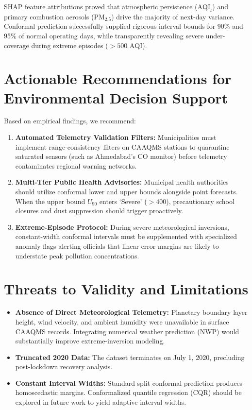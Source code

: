 \documentclass[11pt,a4paper]{report}
\begin{document}
SHAP feature attributions proved that atmospheric persistence ($\text{AQI}_t$) and primary combustion aerosols ($\text{PM}_{2.5}$) drive the majority of next-day variance. Conformal prediction successfully supplied rigorous interval bounds for 90\% and 95\% of normal operating days, while transparently revealing severe under-coverage during extreme episodes ($>500\text{ AQI}$).

\section{Actionable Recommendations for Environmental Decision Support}
Based on empirical findings, we recommend:
\begin{enumerate}
    \item \textbf{Automated Telemetry Validation Filters:} Municipalities must implement range-consistency filters on CAAQMS stations to quarantine saturated sensors (such as Ahmedabad's CO monitor) before telemetry contaminates regional warning networks.
    \item \textbf{Multi-Tier Public Health Advisories:} Municipal health authorities should utilize conformal lower and upper bounds alongside point forecasts. When the upper bound $U_{90}$ enters `Severe' ($>400$), precautionary school closures and dust suppression should trigger proactively.
    \item \textbf{Extreme-Episode Protocol:} During severe meteorological inversions, constant-width conformal intervals must be supplemented with specialized anomaly flags alerting officials that linear error margins are likely to understate peak pollution concentrations.
\end{enumerate}

\section{Threats to Validity and Limitations}
\begin{itemize}
    \item \textbf{Absence of Direct Meteorological Telemetry:} Planetary boundary layer height, wind velocity, and ambient humidity were unavailable in surface CAAQMS records. Integrating numerical weather prediction (NWP) would substantially improve extreme-inversion modeling.
    \item \textbf{Truncated 2020 Data:} The dataset terminates on July 1, 2020, precluding post-lockdown recovery analysis.
    \item \textbf{Constant Interval Widths:} Standard split-conformal prediction produces homoscedastic margins. Conformalized quantile regression (CQR) should be explored in future work to yield adaptive interval widths.
\end{itemize}
\end{document}

